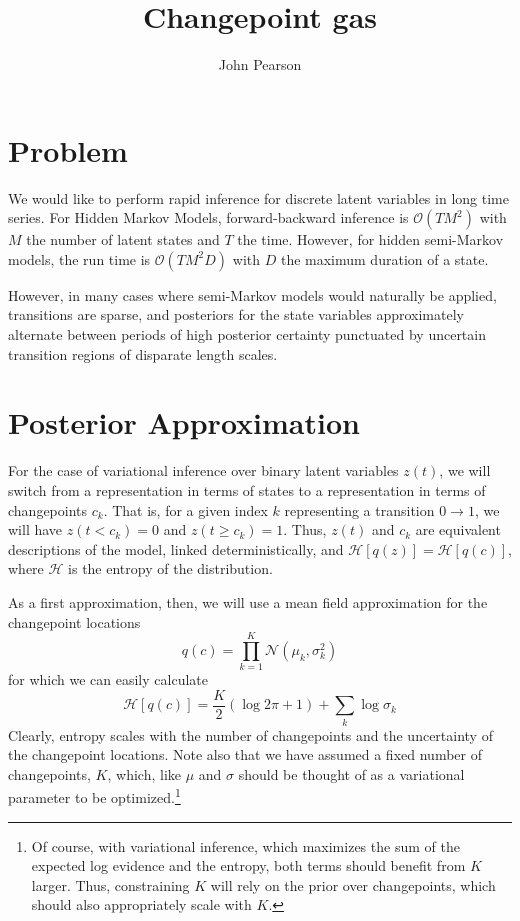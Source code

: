 \documentclass[11pt]{article}
\begin{document}
\title{Changepoint gas}
\author{John Pearson}
\maketitle

\section{Problem}
We would like to perform rapid inference for discrete latent variables in long time series. For Hidden Markov Models, forward-backward inference is $\mathcal{O}(TM^2)$ with $M$ the number of latent states and $T$ the time. However, for hidden semi-Markov models, the run time is $\mathcal{O}(TM^2 D)$ with $D$ the maximum duration of a state.

However, in many cases where semi-Markov models would naturally be applied, transitions are sparse, and posteriors for the state variables approximately alternate between periods of high posterior certainty punctuated by uncertain transition regions of disparate length scales.

\section{Posterior Approximation}
For the case of variational inference over binary latent variables $z(t)$, we will switch from a representation in terms of states to a representation in terms of changepoints $c_k$. That is, for a given index $k$ representing a transition $0 \rightarrow 1$, we will have $z(t < c_k) = 0$ and $z(t \ge c_k) = 1$. Thus, $z(t)$ and $c_k$ are equivalent descriptions of the model, linked deterministically, and $\mathcal{H}[q(z)] = \mathcal{H}[q(c)]$, where $\mathcal{H}$ is the entropy of the distribution.

As a first approximation, then, we will use a mean field approximation for the changepoint locations
\begin{equation}
\label{qc}
    q(c) = \prod_{k = 1}^K \mathcal{N}(\mu_k, \sigma^2_k)
\end{equation}
for which we can easily calculate
\begin{equation}
    \mathcal{H}[q(c)] = \frac{K}{2}(\log 2\pi + 1) + \sum_k \log \sigma_k
\end{equation}
Clearly, entropy scales with the number of changepoints and the uncertainty of the changepoint locations. Note also that we have assumed a fixed number of changepoints, $K$, which, like $\mu$ and $\sigma$ should be thought of as a variational parameter to be optimized.\footnote{Of course, with variational inference, which maximizes the sum of the expected log evidence and the entropy, both terms should benefit from $K$ larger. Thus, constraining $K$ will rely on the prior over changepoints, which should also appropriately scale with $K$.}
\end{document}
